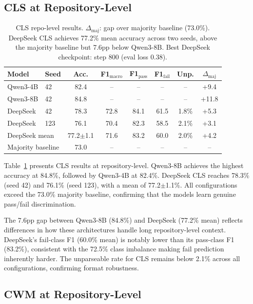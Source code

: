 \documentclass[11pt]{article}
\begin{document}
\subsection{CLS at Repository-Level}

\begin{table}[t]
\centering
\small
\begin{tabular}{llcccccc}
\toprule
\textbf{Model} & \textbf{Seed} & \textbf{Acc.} & \textbf{F1$_\text{macro}$} & \textbf{F1$_\text{pass}$} & \textbf{F1$_\text{fail}$} & \textbf{Unp.} & \textbf{$\Delta_\text{maj}$} \\
\midrule
Qwen3-4B  & 42  & 82.4 & -- & -- & -- & -- & +9.4 \\
Qwen3-8B  & 42  & 84.8 & -- & -- & -- & -- & +11.8 \\
\midrule
DeepSeek  & 42  & 78.3 & 72.8 & 84.1 & 61.5 & 1.8\% & +5.3 \\
DeepSeek  & 123 & 76.1 & 70.4 & 82.3 & 58.5 & 2.1\% & +3.1 \\
\midrule
\multicolumn{2}{l}{DeepSeek mean} & 77.2$\pm$1.1 & 71.6 & 83.2 & 60.0 & 2.0\% & +4.2 \\
\midrule
\multicolumn{2}{l}{Majority baseline} & 73.0 & -- & -- & -- & -- & -- \\
\bottomrule
\end{tabular}
\caption{CLS repo-level results. $\Delta_\text{maj}$: gap over majority baseline (73.0\%). DeepSeek CLS achieves 77.2\% mean accuracy across two seeds, above the majority baseline but 7.6pp below Qwen3-8B. Best DeepSeek checkpoint: step 800 (eval loss 0.38).}
\label{tab:cls_repo}
\end{table}

Table~\ref{tab:cls_repo} presents CLS results at repository-level. Qwen3-8B achieves the highest accuracy at 84.8\%, followed by Qwen3-4B at 82.4\%. DeepSeek CLS reaches 78.3\% (seed 42) and 76.1\% (seed 123), with a mean of 77.2$\pm$1.1\%. All configurations exceed the 73.0\% majority baseline, confirming that the models learn genuine pass/fail discrimination.

The 7.6pp gap between Qwen3-8B (84.8\%) and DeepSeek (77.2\% mean) reflects differences in how these architectures handle long repository-level context. DeepSeek's fail-class F1 (60.0\% mean) is notably lower than its pass-class F1 (83.2\%), consistent with the 72.5\% class imbalance making fail prediction inherently harder. The unparseable rate for CLS remains below 2.1\% across all configurations, confirming format robustness.

\subsection{CWM at Repository-Level}
\end{document}
